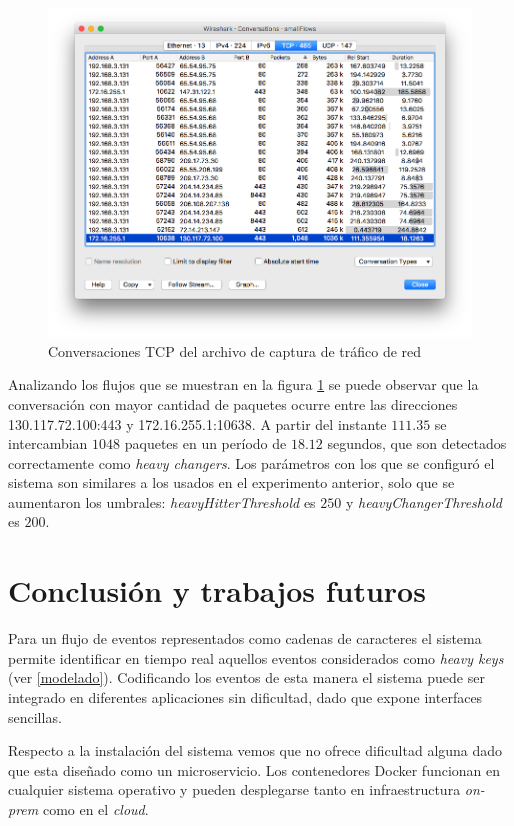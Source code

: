 \documentclass[a4paper,10pt, oneside]{article}
\begin{document}
\begin{figure}[htbp]
	\centering
	\includegraphics[width=1\textwidth]{graph/smallFlows_conversations.png}
	\caption{Conversaciones TCP del archivo de captura de tráfico de red}
	\label{fig:smallFlows_conversation}
	
\end{figure}

Analizando los flujos que se muestran en la figura \ref{fig:smallFlows_conversation} se puede observar que la conversación con mayor cantidad de paquetes ocurre entre las direcciones 130.117.72.100:443 y 172.16.255.1:10638. A partir del instante $111.35$ se intercambian $1048$ paquetes en un período de $18.12$ segundos, que son detectados correctamente como \textit{heavy changers}. Los parámetros con los que se configuró el sistema son similares a los usados en el experimento anterior, solo que se aumentaron los umbrales: \textit{heavyHitterThreshold} es $250$ y \textit{heavyChangerThreshold} es $200$.

\section{Conclusión y trabajos futuros}
Para un flujo de eventos representados como cadenas de caracteres el sistema permite identificar en tiempo real aquellos eventos considerados como \textit{heavy keys} (ver \ref{modelado}). Codificando los eventos de esta manera el sistema puede ser integrado en diferentes aplicaciones sin dificultad, dado que expone interfaces sencillas.

Respecto a la instalación del sistema vemos que no ofrece dificultad alguna dado que esta diseñado como un microservicio. Los contenedores Docker funcionan en cualquier sistema operativo y pueden desplegarse tanto en infraestructura \textit{on-prem} como en el \textit{cloud}.
\end{document}
